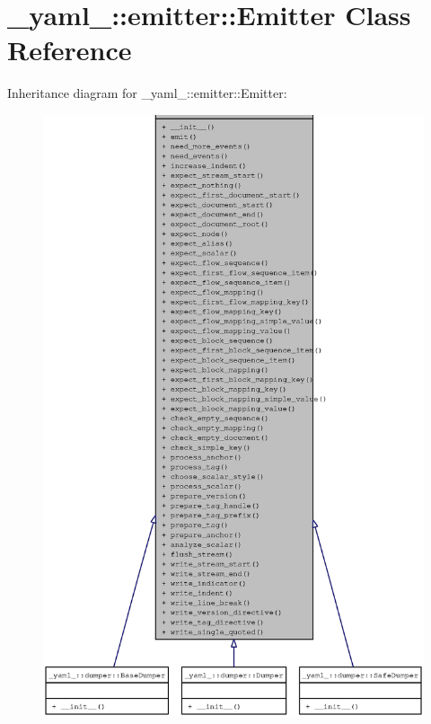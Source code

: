 \section{\_\-yaml\_\-::emitter::Emitter Class Reference}
\label{class__yaml___1_1emitter_1_1Emitter}
Inheritance diagram for \_\-yaml\_\-::emitter::Emitter:\nopagebreak
\begin{figure}[H]
\begin{center}
\leavevmode
\includegraphics[width=400pt]{class__yaml___1_1emitter_1_1Emitter__inherit__graph}
\end{center}
\end{figure}
